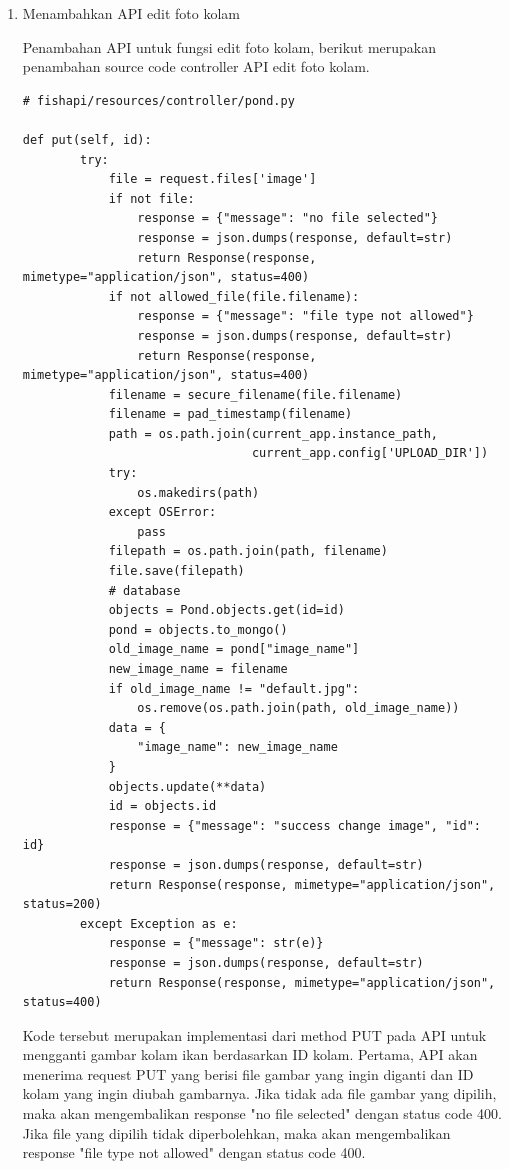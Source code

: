 \begin{enumerate}[1.]
\item Menambahkan API edit foto kolam

Penambahan API untuk fungsi edit foto kolam, berikut merupakan penambahan source code controller API edit foto kolam.

\begin{lstlisting}
# fishapi/resources/controller/pond.py

def put(self, id):
        try:
            file = request.files['image']
            if not file:
                response = {"message": "no file selected"}
                response = json.dumps(response, default=str)
                return Response(response, mimetype="application/json", status=400)
            if not allowed_file(file.filename):
                response = {"message": "file type not allowed"}
                response = json.dumps(response, default=str)
                return Response(response, mimetype="application/json", status=400)
            filename = secure_filename(file.filename)
            filename = pad_timestamp(filename)
            path = os.path.join(current_app.instance_path,
                                current_app.config['UPLOAD_DIR'])
            try:
                os.makedirs(path)
            except OSError:
                pass
            filepath = os.path.join(path, filename)
            file.save(filepath)
            # database
            objects = Pond.objects.get(id=id)
            pond = objects.to_mongo()
            old_image_name = pond["image_name"]
            new_image_name = filename
            if old_image_name != "default.jpg":
                os.remove(os.path.join(path, old_image_name))
            data = {
                "image_name": new_image_name
            }
            objects.update(**data)
            id = objects.id
            response = {"message": "success change image", "id": id}
            response = json.dumps(response, default=str)
            return Response(response, mimetype="application/json", status=200)
        except Exception as e:
            response = {"message": str(e)}
            response = json.dumps(response, default=str)
            return Response(response, mimetype="application/json", status=400)
\end{lstlisting}

Kode tersebut merupakan implementasi dari method PUT pada API untuk mengganti gambar kolam ikan berdasarkan ID kolam. Pertama, API akan menerima request PUT yang berisi file gambar yang ingin diganti dan ID kolam yang ingin diubah gambarnya. Jika tidak ada file gambar yang dipilih, maka akan mengembalikan response "no file selected" dengan status code 400. Jika file yang dipilih tidak diperbolehkan, maka akan mengembalikan response "file type not allowed" dengan status code 400.


\end{enumerate}
